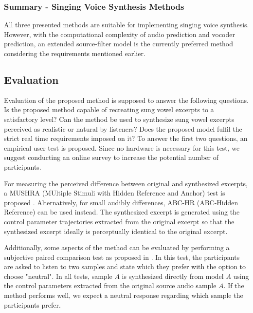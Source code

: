 \documentclass{article}
\begin{document}
\subsubsection*{Summary - Singing Voice Synthesis Methods}

All three presented methods are suitable for implementing singing voice synthesis. However, with the computational complexity of audio prediction and vocoder prediction, an extended source-filter model is the currently preferred method considering the requirements mentioned earlier.\\

\subsection{Evaluation}

Evaluation of the proposed method is supposed to answer the following questions. Is the proposed method capable of recreating sung vowel excerpts to a satisfactory level? Can the method be used to synthesize sung vowel excerpts perceived as realistic or natural by listeners? Does the proposed model fulfil the strict real time requirements imposed on it? To answer the first two questions, an empirical user test is proposed. Since no hardware is necessary for this test, we suggest conducting an online survey to increase the potential number of participants. 

For measuring the perceived difference between original and synthesized excerpts, a MUSHRA (MUltiple Stimuli with Hidden Reference and Anchor) \cite{itu-r_recommendation_bs.1534_method_2003} test is proposed \cite{morise_cheaptrick_2015}\cite{morise_world:_2016}\cite{blaauw_neural_2017-1}. Alternatively, for small audibly differences, ABC-HR (ABC-Hidden Reference) \cite{itu-r_recommendation_bs.1534_method_2003} can be used instead. The synthesized excerpt is generated using the control parameter trajectories extracted from the original excerpt so that  the synthesized excerpt ideally is perceptually identical to the original excerpt. 

Additionally, some aspects of the method can be evaluated by performing a subjective paired comparison test as proposed in \cite{oord_wavenet:_2016}. In this test, the participants are asked to listen to two samples and state which they prefer with the option to choose "neutral". In all tests, sample $A$ is synthesized directly from model $A$ using the control parameters extracted from the original source audio sample $A$. If the method performs well, we expect a neutral response regarding which sample the participants prefer.
\end{document}
